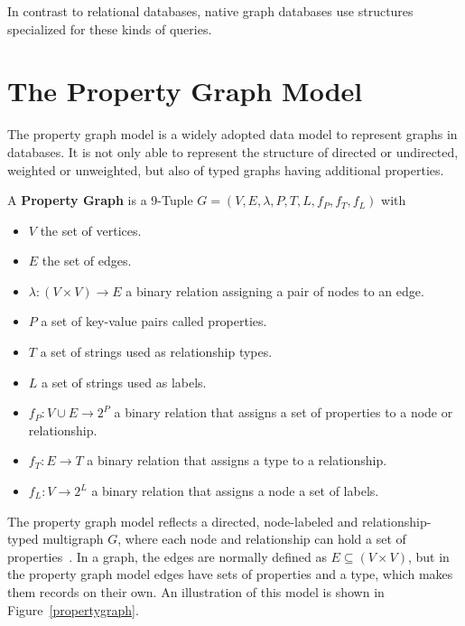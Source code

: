         In contrast to relational databases, native graph databases use structures specialized for these kinds of queries.
            
    \section{The Property Graph Model}\label{prop-graph-model}
        The property graph model is a widely adopted data model to represent graphs in databases.
        It is not only able to represent the structure of directed or undirected, weighted or unweighted, but also of typed graphs having additional properties.

        A \textbf{Property Graph} is a 9-Tuple $G = (V, E, \lambda, P, T, L, f_P, f_T, f_L)$ with 
        \begin{itemize}
            \item $V$ the set of vertices.
            \item $E$ the set of edges.
            \item $\lambda: (V \times V) \rightarrow E$ a binary relation assigning a pair of nodes to an edge.
            \item $P$ a set of key-value pairs called properties.
            \item $T$ a set of strings used as relationship types.
            \item $L$ a set of strings used as labels.
            \item $f_P: V \cup E \rightarrow 2^P$ a binary relation that assigns a set of properties to a node or relationship.
            \item $f_T: E \rightarrow T$ a binary relation that assigns a type to a relationship.
            \item  $f_L: V \rightarrow 2^L$ a binary relation that assigns a node a set of labels.
        \end{itemize} 
        \smallskip
        The property graph model reflects a directed, node-labeled and relationship-typed multigraph $G$, where each node and relationship can hold a set of properties~\cite{angles2018property, rodriguez2012graph, Rodriguez2010ConstructionsFD}.
        In a graph, the edges are normally defined as $E \subseteq (V \times V)$, but in the property graph model edges have sets of properties and a type, which makes them records on their own. 
        An illustration of this model is shown in Figure~\ref{propertygraph}.
        

